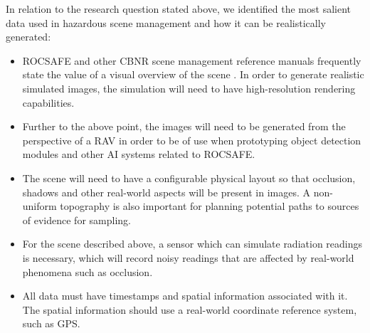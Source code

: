 \par In relation to the research question stated above, we identified the most salient data used in hazardous scene management and how it can be realistically generated: 
\begin{itemize}
    \item ROCSAFE and other CBNR scene management reference manuals frequently state the value of a visual overview of the scene \cite{StandardizationOffice2012AJP-3.8ADefence}. In order to generate realistic simulated images, the simulation will need to have high-resolution rendering capabilities.
    \item Further to the above point, the images will need to be generated from the perspective of a RAV in order to be of use when prototyping object detection modules and other AI systems related to ROCSAFE.%
    \item The scene will need to have a configurable physical layout so that occlusion, shadows and other real-world aspects will be present in images. A non-uniform topography is also important for planning potential paths to sources of evidence for sampling.
    \item For the scene described above, a sensor which can simulate radiation readings is necessary, which will record noisy readings that are affected by real-world phenomena such as occlusion.
    \item All data must have timestamps and spatial information associated with it. The spatial information should use a real-world coordinate reference system, such as GPS.
\end{itemize}

